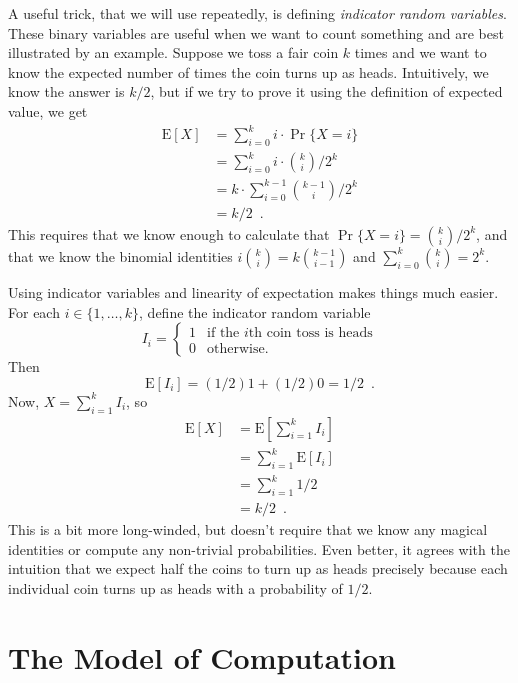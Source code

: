 \documentclass[10pt]{book}
\newcommand{\seclabel}[1]{\label{sec:#1}}
\theoremstyle{plain}
\theoremstyle{definition}
\newcommand{\E}{\mathrm{E}}
\begin{document}
A useful trick, that we will use repeatedly, is defining \emph{indicator
random variables}.
%
These binary variables are useful when we want to
count something and are best illustrated by an example.  Suppose we toss
a fair coin $k$ times and we want to know the expected number of times
the coin turns up as heads.
%
Intuitively, we know the answer is $k/2$,
but if we try to prove it using the definition of expected value, we get
\begin{align*}
   \E[X] & = \sum_{i=0}^k i\cdot\Pr\{X=i\} \\
         & = \sum_{i=0}^k i\cdot\binom{k}{i}/2^k \\
         & = k\cdot \sum_{i=0}^{k-1}\binom{k-1}{i}/2^k \\
         & = k/2 \enspace .
\end{align*}
This requires that we know enough to calculate that $\Pr\{X=i\}
= \binom{k}{i}/2^k$, and that we know the binomial identities
$i\binom{k}{i}=k\binom{k-1}{i-1}$ and $\sum_{i=0}^{k} \binom{k}{i} = 2^{k}$.

Using indicator variables and linearity of expectation makes things
much easier.  For each $i\in\{1,\ldots,k\}$, define the indicator
random variable
\[
    I_i = \begin{cases}
           1 & \text{if the $i$th coin toss is heads} \\
           0 & \text{otherwise.}
          \end{cases}
\]
Then 
\[ \E[I_i] = (1/2)1 + (1/2)0 = 1/2 \enspace . \]
Now, $X=\sum_{i=1}^k I_i$, so
\begin{align*}
   \E[X] & = \E\left[\sum_{i=1}^k I_i\right] \\
         & = \sum_{i=1}^k \E[I_i] \\
         & = \sum_{i=1}^k 1/2 \\
         & = k/2 \enspace .
\end{align*}
This is a bit more long-winded, but doesn't require that we know any
magical identities or compute any non-trivial probabilities. Even better,
it agrees with the intuition that we expect half the coins to turn up as
heads precisely because each individual coin turns up as heads with
a probability of $1/2$.

\section{The Model of Computation}
\seclabel{model}
\end{document}

